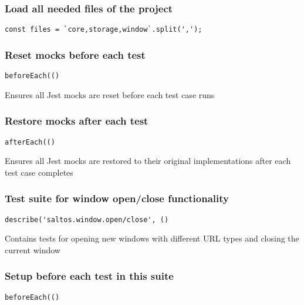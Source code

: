 \documentclass[a4paper]{article}
\begin{document}
\hypertarget{toc282}{}
\subsubsection{Load all needed files of the project}

\begin{lstlisting}
const files = `core,storage,window`.split(',');
\end{lstlisting}

\hypertarget{toc283}{}
\subsubsection{Reset mocks before each test}

\begin{lstlisting}
beforeEach(()
\end{lstlisting}

Ensures all Jest mocks are reset before each test case runs

\hypertarget{toc284}{}
\subsubsection{Restore mocks after each test}

\begin{lstlisting}
afterEach(()
\end{lstlisting}

Ensures all Jest mocks are restored to their original implementations
after each test case completes

\hypertarget{toc285}{}
\subsubsection{Test suite for window open/close functionality}

\begin{lstlisting}
describe('saltos.window.open/close', ()
\end{lstlisting}

Contains tests for opening new windows with different URL types
and closing the current window

\hypertarget{toc286}{}
\subsubsection{Setup before each test in this suite}

\begin{lstlisting}
beforeEach(()
\end{lstlisting}
\end{document}

